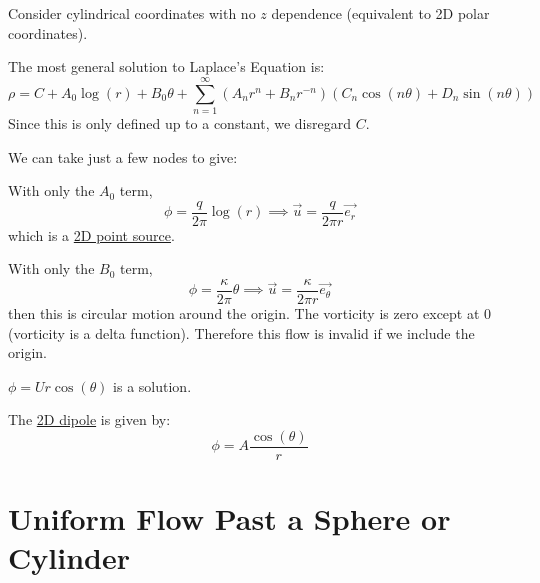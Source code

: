 \documentclass[../Main.tex]{subfiles}
\begin{document}
\begin{example}
    Consider cylindrical coordinates with no $z$ dependence (equivalent to 2D polar coordinates).

    The most general solution to Laplace's Equation is:
    \begin{equation*}
        \rho = C + A_0 \log(r) + B_0 \theta + \sum_{n=1}^{\infty} (A_n r^n + B_n r^{-n}) (C_n \cos(n\theta) + D_n \sin(n\theta))
    \end{equation*}
    Since this is only defined up to a constant, we disregard $C$.
    
    We can take just a few nodes to give:
    \item With only the $A_0$ term,
        \begin{equation*}
            \phi = \frac{q}{2\pi}\log(r) \implies \vec{u} = \frac{q}{2\pi r} \vec{e_r}
        \end{equation*}
        which is a \underline{2D point source}.
    \item With only the $B_0$ term,
        \begin{equation*}
            \phi = \frac{\kappa}{2\pi}\theta \implies \vec{u} = \frac{\kappa}{2\pi r} \vec{e_\theta}
        \end{equation*}
        then this is circular motion around the origin. The vorticity is zero except at $0$ (vorticity is a delta function). Therefore this flow is invalid if we include the origin. 
    \item $\phi = Ur\cos(\theta)$ is a solution. %
    \item The \underline{2D dipole} is given by:
        \begin{equation*}
            \phi = A \frac{\cos(\theta)}{r}
        \end{equation*}
\end{example}
\section{Uniform Flow Past a Sphere or Cylinder}
\end{document}
